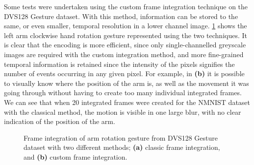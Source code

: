 Some tests were undertaken using the custom frame integration technique on the DVS128 Gesture dataset. With this method, information can be stored to the same, or even smaller, temporal resolution in a lower channel image. \cref{fig:frame_integration_comparison} shows the left arm clockwise hand rotation gesture represented using the two techniques. It is clear that the encoding is more efficient, since only single-channelled greyscale images are required with the custom integration method, and more fine-grained temporal information is retained since the intensity of the pixels signifies the number of events occurring in any given pixel. For example, in \textbf{(b)} it is possible to visually know where the position of the arm is, as well as the movement it was going through without having to create too many individual integrated frames. We can see that when 20 integrated frames were created for the NMNIST dataset with the classical method, the motion is visible in one large blur, with no clear indication of the position of the arm.

\begin{figure}[htb]%
    \centering
    \qquad
    \caption{Frame integration of arm rotation gesture from DVS128 Gesture dataset with two different methods; \textbf{(a)} classic frame integration, and \textbf{(b)} custom frame integration.}%
    \label{fig:frame_integration_comparison}%
\end{figure}


